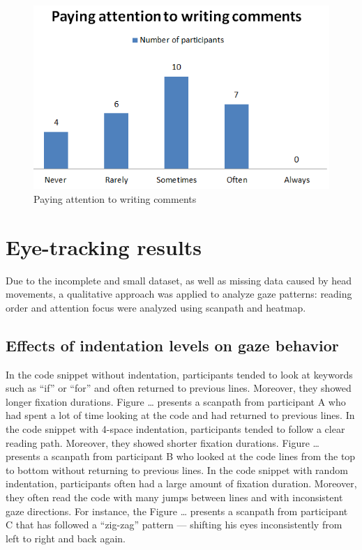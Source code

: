 \begin{figure} [H]
  \centering
  \includegraphics[scale=1.2]{figures/comAt.png}
  \caption{Paying attention to writing comments }
  \label{fig:AnhangsChor}
\end{figure}

\section{Eye-tracking results}
Due to the incomplete and small dataset, as well as missing data caused by head movements, a qualitative approach was applied to analyze gaze patterns: reading order and attention focus were analyzed using scanpath and heatmap.  



\subsection{Effects of indentation levels on gaze behavior}

In the code snippet without indentation, participants tended to look at keywords such as “if” or “for” and often returned to previous lines. Moreover, they showed longer fixation durations.  Figure … presents a scanpath from participant A who had spent a lot of time looking at the code and had returned to previous lines. In the code snippet with 4-space indentation, participants tended to follow a clear reading path. Moreover, they showed shorter fixation durations.  Figure … presents a scanpath from participant B who looked at the code lines from the top to bottom without returning to previous lines. 
In the code snippet with random indentation, participants often had a large amount of fixation duration.  Moreover, they often read the code with many jumps between lines and with inconsistent gaze directions. For instance, the Figure  … presents a scanpath from participant C that has followed a “zig-zag” pattern — shifting his eyes inconsistently from left to right and back again.  

